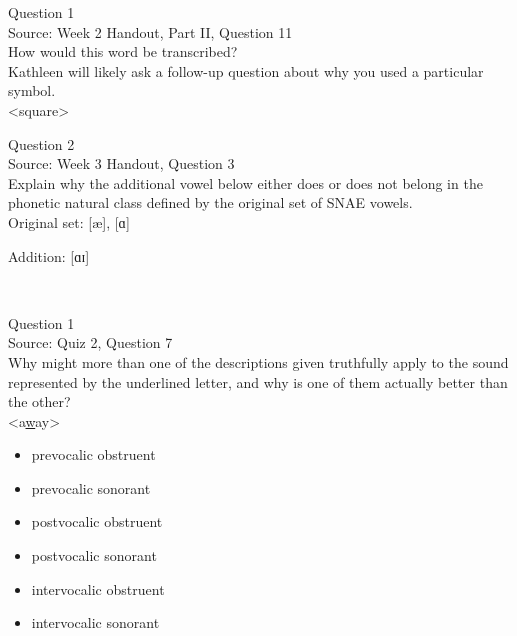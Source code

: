 \documentclass[12pt]{article}
\begin{document}
{\large Question 1}\\

Source: Week 2 Handout, Part II, Question 11\\

How would this word be transcribed?\\ Kathleen will likely ask a follow-up question about why you used a particular symbol.\\

<square>


\newpage

{\large Question 2}\\

Source: Week 3 Handout, Question 3\\

Explain why the additional vowel below either does or does not belong in the phonetic natural class defined by the original set of SNAE vowels.\\

Original set: {[æ]}, {[ɑ]}

Addition: {[ɑɪ]}


\newpage

\begin{center}
\textbf{{\color{red}{\HUGE END OF EXAM}}}\\

\end{center}
\newpage

\begin{center}
\textbf{{\color{blue}{\HUGE START OF EXAM\\}}}

\textbf{{\color{blue}{\HUGE Student ID: 94675\\}}}

\textbf{{\color{blue}{\HUGE 4:20\\}}}

\end{center}
\newpage

{\large Question 1}\\

Source: Quiz 2, Question 7\\

Why might more than one of the descriptions given truthfully apply to the sound represented by the underlined letter, and why is one of them actually better than the other?\\

<a\underline{w}ay>

\begin{itemize} \item prevocalic obstruent \item prevocalic sonorant \item postvocalic obstruent \item postvocalic sonorant \item intervocalic obstruent \item intervocalic sonorant \end{itemize}
\end{document}
